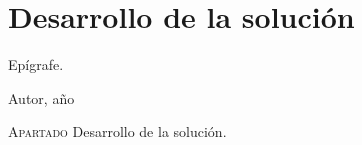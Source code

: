 \chapter{Desarrollo de la solución}\label{chp-04}
\epigraph{Epígrafe.}{Autor, año}

\lettrine[lraise=-0.1, lines=2, loversize=0.2]{A}{partado} Desarrollo de la solución. 




\endinput
